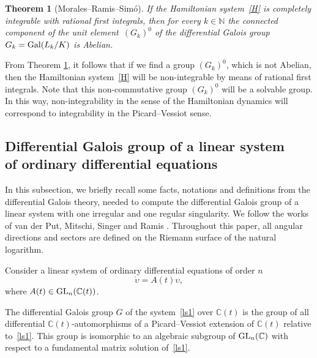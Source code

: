 \documentclass[10pt,a4paper]{amsart}
\numberwithin{equation}{section}
\newtheorem{Theorem}{Theorem}[section]
\begin{document}
 \begin{Theorem}[Morales--Ramis--Sim\'{o}]\label{MRS}
 If the Hamiltonian system~\eqref{H} is completely integrable with rational first integrals, then for every $k\in\mathbb{N}$
 the connected component of the unit element~$(G_k)^0$ of the differential Galois group $G_k={\rm Gal}(L_k/K)$
 is Abelian.
 \end{Theorem}

 From Theorem \ref{MRS}, it follows that if we find a group $(G_k)^0$, which is not Abelian, then the Hamiltonian system~\eqref{H} will be non-integrable
 by means of rational first integrals.
 Note that this non-commutative group $(G_k)^0$ will be a solvable group. In this way,
 non-integrability in the sense of the Hamiltonian dynamics will correspond to integrability in the Picard--Vessiot sense.

 \subsection[Differential Galois group of a linear system of ordinary differential equations]{Differential Galois group of a linear system \\ of ordinary differential equations}

 In this subsection, we briefly recall some facts, notations and definitions from the differential Galois theory, needed
 to compute the differential Galois group of a linear system with one irregular and one regular singularity. We follow
 the works of van der Put, Mitschi, Singer and Ramis \cite{Mi,R3, Si, vPS}. Throughout this paper, all angular directions
 and sectors are defined on the Riemann surface of the natural logarithm.

 Consider a linear system of ordinary differential equations of order $n$
 \begin{equation}
 \dot{\upsilon}=A(t) \upsilon ,\label{ls1}
 \end{equation}
 where $A(t)\in {\rm GL}_n(\mathbb{C}(t))$.

 \begin{Definition}\label{Gal}
The differential Galois group $G$ of the system~\eqref{ls1} over $\mathbb{C}(t)$ is the group of all differential $\mathbb{C}(t)$-automorphisms of
 a Picard--Vessiot extension of $\mathbb{C}(t)$ relative to~\eqref{ls1}. This group is isomorphic to an algebraic subgroup of ${\rm GL}_n(\mathbb{C})$
 with respect to a fundamental matrix solution of~\eqref{ls1}.
 \end{Definition}
\end{document}
